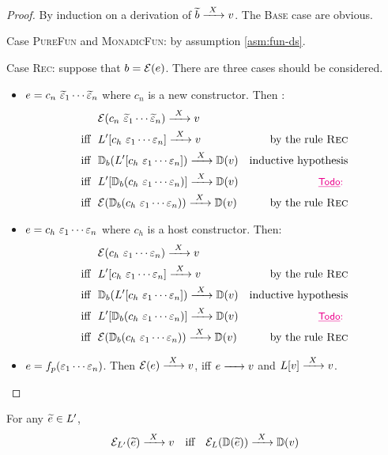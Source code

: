 \begin{proof}
  By induction on a derivation of $\widetilde{b} \xrightarrow{~X~} v$. 
  The \textsc{Base} case are obvious.

  Case \textsc{PureFun} and \textsc{MonadicFun}: by assumption \ref{asm:fun-ds}. 
  
  Case \textsc{Rec}: suppose that $b=\mathcal{E}(e)$. There are three cases should be considered.
  \begin{itemize}    
    \item $e=c_n~\widetilde{\varepsilon}_1\cdots \widetilde{\varepsilon}_n$ where $c_n$ is a new constructor.
      Then \todo{}:
      \begin{align*}
        & \mathcal{E}(c_n~\widetilde{\varepsilon}_1\cdots \widetilde{\varepsilon}_n) \xrightarrow{~X~} v \\
        \text{iff}~~ & L'[c_h~\varepsilon_1\cdots \varepsilon_n]\xrightarrow{~X~} v & \text{by the rule \textsc{Rec}} \\
        \text{iff}~~ & \mathbb{D}_b(L'[c_h~\varepsilon_1\cdots \varepsilon_n]) \xrightarrow{~X~} \mathbb{D}(v) & \text{inductive hypothesis} \\
        \text{iff}~~ & L'[\mathbb{D}_b(c_h~\varepsilon_1\cdots \varepsilon_n)] \xrightarrow{~X~} \mathbb{D}(v) & \text{{\small\color{magenta}\underline{\sf{Todo}}:} {\color{magenta}{\small }}} \\
        \text{iff}~~ & \mathcal{E}(\mathbb{D}_b(c_h~\varepsilon_1\cdots \varepsilon_n)) \xrightarrow{~X~} \mathbb{D}(v) & \text{by the rule \textsc{Rec}} \\
      \end{align*}
    \item $e=c_h~\varepsilon_1\cdots \varepsilon_n$ where $c_h$ is a host constructor.
      Then:
      \begin{align*}
        & \mathcal{E}(c_h~\varepsilon_1\cdots \varepsilon_n) \xrightarrow{~X~} v \\
        \text{iff}~~ & L'[c_h~\varepsilon_1\cdots \varepsilon_n]\xrightarrow{~X~} v & \text{by the rule \textsc{Rec}} \\
        \text{iff}~~ & \mathbb{D}_b(L'[c_h~\varepsilon_1\cdots \varepsilon_n]) \xrightarrow{~X~} \mathbb{D}(v) & \text{inductive hypothesis} \\
        \text{iff}~~ & L'[\mathbb{D}_b(c_h~\varepsilon_1\cdots \varepsilon_n)] \xrightarrow{~X~} \mathbb{D}(v) & \text{{\small\color{magenta}\underline{\sf{Todo}}:} {\color{magenta}{\small }}} \\
        \text{iff}~~ & \mathcal{E}(\mathbb{D}_b(c_h~\varepsilon_1\cdots \varepsilon_n)) \xrightarrow{~X~} \mathbb{D}(v) & \text{by the rule \textsc{Rec}} \\
      \end{align*}
    \item $e=f_p(\varepsilon_1\cdots \varepsilon_n)$. 
      Then $\mathcal{E}(e)\xrightarrow{~X~} v$, iff $e\lr v$ and $L[v]\xrightarrow{~X~} v$.
  \end{itemize}
\end{proof}

\begin{theorem}[Correctness]
  For any $\widetilde{e} \in L'$, 
  \[ \mathcal{E}_{L'}(\widetilde{e}) \xrightarrow{~X~} v \quad\text{iff}\quad \mathcal{E}_{L}(\mathbb{D}(\widetilde{e})) \xrightarrow{~X~} \mathbb{D}(v) \]
\end{theorem}

